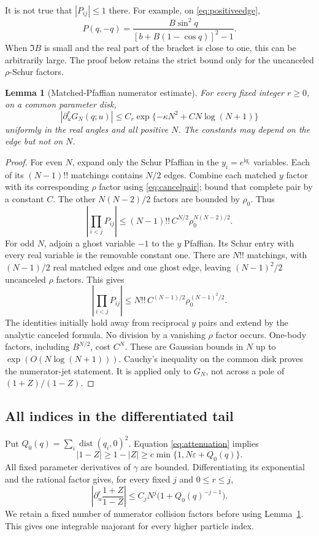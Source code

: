 \documentclass[11pt]{article}
\numberwithin{equation}{section}
\newtheorem{lemma}[theorem]{Lemma}
\theoremstyle{definition}
\newcommand{\ii}{\mathrm i}
\newcommand{\eps}{\varepsilon}
\newcommand{\dist}{\operatorname{dist}}
\begin{document}
It is not true that $|P_{ij}|\le1$ there. For example, on
\eqref{eq:positiveedge},
\[
 P(q,-q)=\frac{B\sin^2q}
               {[b+B(1-\cos q)]^2-1}.
\]
When $\Im B$ is small and the real part of the bracket is close to one,
this can be arbitrarily large. The proof below retains the strict bound
only for the uncanceled $\rho$-Schur factors.

\begin{lemma}[Matched-Pfaffian numerator estimate]\label{lem:matching}
For every fixed integer $r\ge0$, on a common parameter disk,
\[
 |\partial_u^rG_N(q;u)|
 \le C_r\exp\{-\kappa N^2+C N\log(N+1)\}
\]
uniformly in the real angles and all positive $N$. The constants may
depend on the edge but not on $N$.
\end{lemma}
\begin{proof}
For even $N$, expand only the Schur Pfaffian in the $y_i=e^{\ii q_i}$
variables. Each of its $(N-1)!!$ matchings contains $N/2$ edges. Combine
each matched $y$ factor with its corresponding $\rho$ factor using
\eqref{eq:cancelpair}; bound that complete pair by a constant $C$.
The other $N(N-2)/2$ factors are bounded by $\rho_0$. Thus
\[
 \left|\prod_{i<j}P_{ij}\right|
 \le (N-1)!!\,C^{N/2}\rho_0^{N(N-2)/2}.
\]
For odd $N$, adjoin a ghost variable $-1$ to the $y$ Pfaffian.
Its Schur entry with every real variable is the removable constant one.
There are $N!!$ matchings, with $(N-1)/2$ real matched edges and one
ghost edge, leaving $(N-1)^2/2$ uncanceled $\rho$ factors. This gives
\[
 \left|\prod_{i<j}P_{ij}\right|
 \le N!!\,C^{(N-1)/2}\rho_0^{(N-1)^2/2}.
\]
The identities initially hold away from reciprocal $y$ pairs and extend
by the analytic canceled formula. No division by a vanishing $\rho$
factor occurs. One-body factors, including $B^{N/2}$, cost $C^N$.
These are Gaussian bounds in $N$ up to $\exp(O(N\log(N+1)))$.
Cauchy's inequality on the common disk proves the numerator-jet
statement. It is applied only to $G_N$, not across a pole of
$(1+Z)/(1-Z)$.
\end{proof}

\subsection{All indices in the differentiated tail}
Put $Q_0(q)=\sum_i\dist(q_i,0)^2$. Equation
\eqref{eq:attenuation} implies
\[
 |1-Z|\ge1-|Z|\ge c\min\{1,N\eps+Q_0(q)\}.
\]
All fixed parameter derivatives of $\gamma$ are bounded. Differentiating
its exponential and the rational factor gives, for every fixed $j$ and
$0\le r\le j$,
\begin{equation}\label{eq:globaljet}
 \left|\partial_u^r\frac{1+Z}{1-Z}\right|
 \le C_jN^j\bigl(1+Q_0(q)^{-j-1}\bigr).
\end{equation}
We retain a fixed number of numerator collision factors before using
Lemma~\ref{lem:matching}. This gives one integrable majorant for every
higher particle index.
\end{document}
